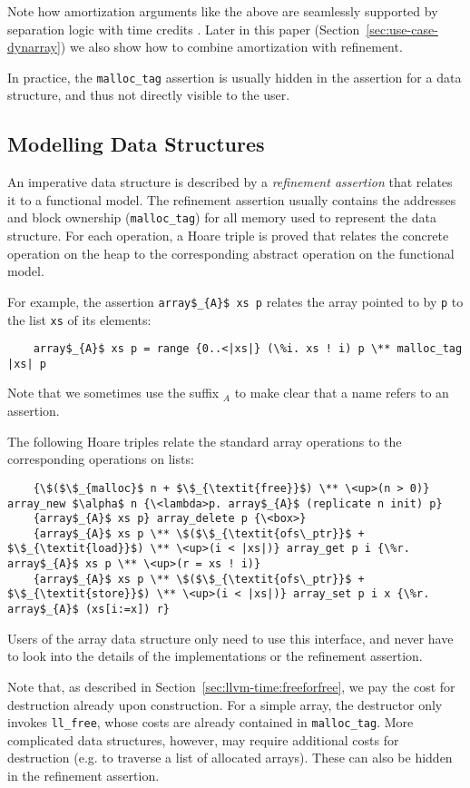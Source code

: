 \documentclass[acmsmall]{acmart}
\newcommand{\is}{\lstinline[language=isabelle]}
\begin{document}
Note how amortization arguments like the above are seamlessly supported by separation logic with time credits \cite{Atkey10}. 
Later in this paper (Section~\ref{sec:use-case-dynarray}) we also show how to combine amortization with refinement.

In practice, the \is{malloc_tag} assertion is usually hidden in the assertion for a data structure, and thus not directly visible to the user.


\subsection{Modelling Data Structures}

An imperative data structure is described by a \emph{refinement assertion} that relates it to a functional model. 
The refinement assertion usually contains the addresses and block ownership (\is{malloc_tag}) for all memory used to represent the data structure. 
For each operation, a Hoare triple is proved that
relates the concrete operation on the heap to the corresponding abstract operation on the functional model.

For example, the assertion \is!array$_{A}$ xs p! relates the array pointed to by \is$p$ to the list \is$xs$ of its elements:
\begin{lstlisting}
    array$_{A}$ xs p = range {0..<|xs|} (\%i. xs ! i) p \** malloc_tag |xs| p
\end{lstlisting}
Note that we sometimes use the suffix ${}_A$ to make clear that a name refers to an assertion.

The following Hoare triples relate the standard array operations to the corresponding operations on lists:
\begin{lstlisting}
    {\$($\$_{malloc}$ n + $\$_{\textit{free}}$) \** \<up>(n > 0)} array_new $\alpha$ n {\<lambda>p. array$_{A}$ (replicate n init) p}
    {array$_{A}$ xs p} array_delete p {\<box>}
    {array$_{A}$ xs p \** \$($\$_{\textit{ofs\_ptr}}$ + $\$_{\textit{load}}$) \** \<up>(i < |xs|)} array_get p i {\%r. array$_{A}$ xs p \** \<up>(r = xs ! i)}
    {array$_{A}$ xs p \** \$($\$_{\textit{ofs\_ptr}}$ + $\$_{\textit{store}}$) \** \<up>(i < |xs|)} array_set p i x {\%r. array$_{A}$ (xs[i:=x]) r}
\end{lstlisting}

Users of the array data structure only need to use this interface, and never have to look into the details of the implementations or the refinement assertion.

Note that, as described in Section~\ref{sec:llvm-time:freeforfree}, we pay the cost for destruction already upon construction.
For a simple array, the destructor only invokes \is{ll_free}, whose costs are already contained in \is{malloc_tag}.
More complicated data structures, however, may require additional costs for destruction (e.g. to traverse a list of allocated arrays).
These can also be hidden in the refinement assertion.
\end{document}
